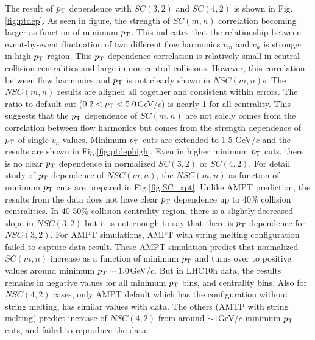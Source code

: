 The result of $p_{\rm{T}}$ dependence with $SC(3,2)$ and $SC(4,2)$ is shown in Fig.\ref{fig:ptdep}. As seen in figure, the strength of $SC(m,n)$ correlation becoming larger as function of minimum $p_{\rm{T}}$. This indicates that the relationship between event-by-event fluctuation of two different flow harmonics $v_m$ and $v_n$ is stronger in high $p_{\rm{T}}$ region. This $p_{\rm{T}}$ dependence correlation is relatively small in central collision centralities and large in non-central collisions. However, this correlation between flow harmonics and $p_{\rm{T}}$ is not clearly shown in $NSC(m,n)$s. The  $NSC(m,n)$ results are aligned all together and consistent within errors. The ratio to default cut ($0.2 < p_{\rm{T}} < 5.0$GeV/$c$) is nearly 1 for all centrality. This suggests that the $p_{\rm{T}}$ dependence of $SC(m,n)$ are not solely comes from the correlation between flow harmonics but comes from the strength dependence of $p_{\rm{T}}$ of single $v_n$ values. Minimum $p_{\rm{T}}$ cuts are extended to 1.5 GeV/$c$ and the results are shown in Fig.\ref{fig:ptdephigh}. Even in higher minimum $p_{\rm{T}}$ cuts, there is no clear $p_{\rm{T}}$ dependence in normalized $SC(3,2)$ or $SC(4,2)$. For detail study of $p_{\rm{T}}$ dependence of  $NSC(m,n)$, the $NSC(m,n)$ as function of minimum $p_{\rm{T}}$ cuts are prepared in Fig.\ref{fig:SC_xpt}. Unlike AMPT prediction, the results from the data does not have clear $p_{\rm{T}}$ dependence up to 40\% collision centralities. In 40-50\% collision centrality region, there is a slightly decreased slope in $NSC(3,2)$ but it is not enough to say that there is $p_{\rm{T}}$ dependence for $NSC(3,2)$. For AMPT simulations, AMPT with string melting configuration failed to capture data result. These AMPT simulation predict that normalized $SC(m,n)$ increase as a function of minimum $p_{\rm{T}}$ and turns over to positive values around minimum $p_{\rm{T}} \sim 1.0$GeV/$c$. But in LHC10h data, the results remains in negative values for all minimum $p_{\rm{T}}$ bins, and centrality bins. Also for $NSC(4,2)$ cases, only AMPT default which has the configuration without string melting, has similar values with data. The others (AMTP with string melting) predict increase of $NSC(4,2)$ from around $\sim 1$GeV/$c$ minimum $p_{\rm{T}}$ cuts, and failed to reproduce the data.

